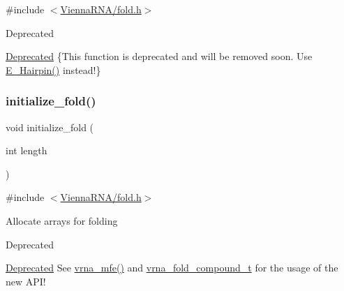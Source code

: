 {\ttfamily \#include $<$\hyperlink{fold_8h}{Vienna\+R\+N\+A/fold.\+h}$>$}

\begin{DoxyRefDesc}{Deprecated}
\item[\hyperlink{deprecated__deprecated000081}{Deprecated}]\{This function is deprecated and will be removed soon. Use \hyperlink{group__loops_gadf943ee9a45b7f4cee9192c06210dace}{E\+\_\+\+Hairpin()} instead!\} \end{DoxyRefDesc}
\mbox{\label{group__mfe__fold__single_gac3f0a28d9cb609d388b155445073fd20}} 
\subsubsection{\texorpdfstring{initialize\+\_\+fold()}{initialize\_fold()}}
{\footnotesize\ttfamily void initialize\+\_\+fold (\begin{DoxyParamCaption}\item[{int}]{length }\end{DoxyParamCaption})}



{\ttfamily \#include $<$\hyperlink{fold_8h}{Vienna\+R\+N\+A/fold.\+h}$>$}

Allocate arrays for folding~\newline
\begin{DoxyRefDesc}{Deprecated}
\item[\hyperlink{deprecated__deprecated000082}{Deprecated}]See \hyperlink{group__mfe__fold_gabd3b147371ccf25c577f88bbbaf159fd}{vrna\+\_\+mfe()} and \hyperlink{group__fold__compound_ga1b0cef17fd40466cef5968eaeeff6166}{vrna\+\_\+fold\+\_\+compound\+\_\+t} for the usage of the new A\+P\+I!\end{DoxyRefDesc}
